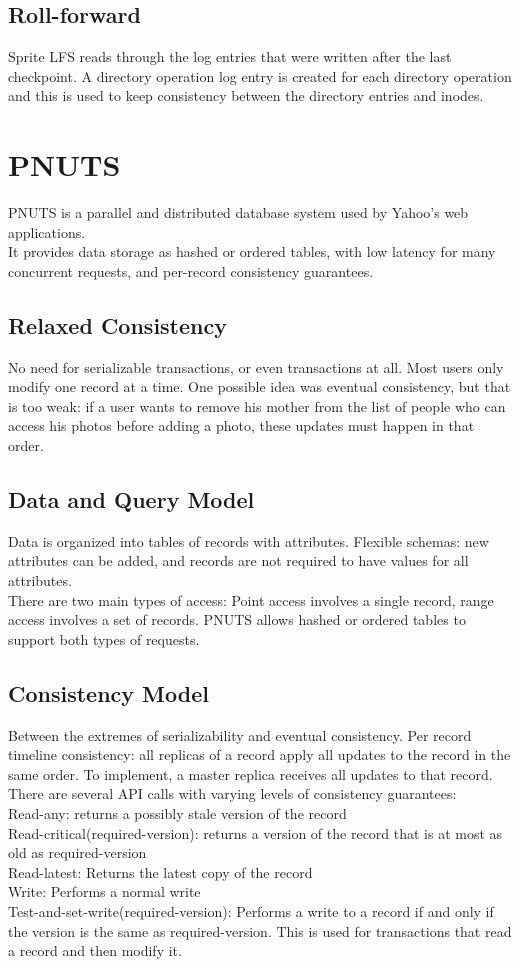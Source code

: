 \subsection{Roll-forward}
Sprite LFS reads through the log entries that were written after the last checkpoint. A directory operation log entry is created for each directory operation and this is used to keep consistency between the directory entries and inodes.

\section{PNUTS}
PNUTS is a parallel and distributed database system used by Yahoo's web applications.\\
It provides data storage as hashed or ordered tables, with low latency for many concurrent requests, and per-record consistency guarantees.
\subsection{Relaxed Consistency}
No need for serializable transactions, or even transactions at all. Most users only modify one record at a time. One possible idea was eventual consistency, but that is too weak: if a user wants to remove his mother from the list of people who can access his photos before adding a photo, these updates must happen in that order.
\subsection{Data and Query Model}
Data is organized into tables of records with attributes. Flexible schemas: new attributes can be added, and records are not required to have values for all attributes.\\
There are two main types of access: Point access involves a single record, range access involves a set of records. PNUTS allows hashed or ordered tables to support both types of requests.
\subsection{Consistency Model}
Between the extremes of serializability and eventual consistency. Per record timeline consistency: all replicas of a record apply all updates to the record in the same order. To implement, a master replica receives all updates to that record. There are several API calls with varying levels of consistency guarantees:\\
Read-any: returns a possibly stale version of the record \\
Read-critical(required-version): returns a version of the record that is at most as old as required-version\\
Read-latest: Returns the latest copy of the record \\
Write: Performs a normal write \\
Test-and-set-write(required-version): Performs a write to a record if and only if the version is the same as required-version. This is used for transactions that read a record and then modify it.
